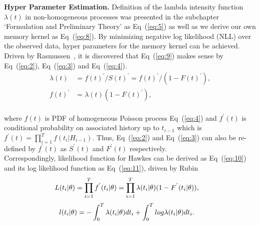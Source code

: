 \documentclass[10pt,letterpaper]{article}
\begin{document}
\textbf{Hyper Parameter Estimation.	}
Definition of the lambda intensity function $\lambda (t)$ in non-homogeneous processes was presented in the subchapter ‘Formulation and Preliminary Theory' as Eq~(\ref{eq:5}) as well as we derive our own memory kernel as Eq~(\ref{eq:8}). By minimizing negative log likelihood (NLL) over the observed data, hyper parameters for the memory kernel can be achieved. Driven by Rasmussen~\cite{bib17}, it is discovered that Eq~(\ref{eq:9}) makes sense by Eq~(\ref{eq:2}), Eq~(\ref{eq:3}) and Eq~(\ref{eq:4}). 
\begin{align}
\label{eq:9}
\lambda(t)&=f(t)^{'}/S(t)^{'}=f(t)^{'}/(1-F(t)^{'}), \nonumber	\\
f(t)^{'}&=\lambda(t)(1-F(t)^{'}),
\end{align}   \\
where $f(t)$ is PDF of homogeneous Poisson process Eq~(\ref{eq:4}) and $f^{'}(t)$ is conditional probability on associated history up to $t_{i-1}$ which is $f^{'}(t)=\prod_{i=1}^{T}f(t_i|H_{i-1})$. Thus, Eq~(\ref{eq:2}) and Eq~(\ref{eq:3}) can also be re-defined by $f^{'}(t)$ as $S^{'}(t)$ and $F^{'}(t)$ respectively.
\\
Correspondingly, likelihood function for Hawkes can be derived as Eq~(\ref{eq:10}) and its log likelihood function as Eq~(\ref{eq:11}), driven by Rubin~\cite{bib18}
\begin{align}
\label{eq:10}
\centering
L(t_i|\theta)&=\prod_{i=1}^{T}f^{'}(t_i|\theta)=\prod_{i=1}^{T}\lambda(t_i|\theta)(1-F^{'}(t_i|\theta)),
\end{align}  
\begin{align}
\label{eq:11}
\centering
l(t_i | \theta)&=-\int_{0}^{T}\lambda(t_i|\theta)dt_i+
\int_{0}^{T}log\lambda(t_i|\theta)dt_i.
\end{align}  
\end{document}
